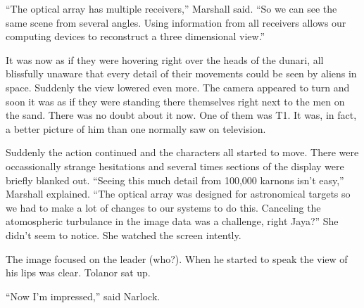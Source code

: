 ``The optical array has multiple receivers,'' Marshall said. ``So we can see the same scene from
several angles. Using information from all receivers allows our computing devices to reconstruct
a three dimensional view.''

It was now as if they were hovering right over the heads of the dunari, all blissfully unaware
that every detail of their movements could be seen by aliens in space. Suddenly the view lowered
even more. The camera appeared to turn and soon it was as if they were standing there themselves
right next to the men on the sand. There was no doubt about it now. One of them was T1. It was,
in fact, a better picture of him than one normally saw on television.

Suddenly the action continued and the characters all started to move. There were occassionally
strange hesitations and several times sections of the display were briefly blanked out. ``Seeing
this much detail from 100,000 karnons isn't easy,'' Marshall explained. ``The optical array was
designed for astronomical targets so we had to make a lot of changes to our systems to do this.
Canceling the atomospheric turbulance in the image data was a challenge, right Jaya?'' She
didn't seem to notice. She watched the screen intently.

The image focused on the leader (who?). When he started to speak the view of his lips was clear.
Tolanor sat up.

``Now I'm impressed,'' said Narlock.
